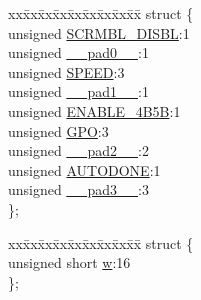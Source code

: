 \begin{DoxyCompactItemize}
\begin{tabbing}
\end{tabbing}\item 
\begin{tabbing}
xx\=xx\=xx\=xx\=xx\=xx\=xx\=xx\=xx\=\kill
struct \{\\
\>unsigned \hyperlink{union_____p_h_y_c_t_r_lbits__t_a55219a321aa70bccb26465498f8caaf0}{SCRMBL\_DISBL}:1\\
\>unsigned \hyperlink{union_____p_h_y_c_t_r_lbits__t_adf71f3d8410c1f1dbbc96680a92c49af}{\_\_pad0\_\_}:1\\
\>unsigned \hyperlink{union_____p_h_y_c_t_r_lbits__t_a95fd4dafd860304d6b44d4fb14881daa}{SPEED}:3\\
\>unsigned \hyperlink{union_____p_h_y_c_t_r_lbits__t_acaf2d0924a107ec6e8d2e31febaf66f9}{\_\_pad1\_\_}:1\\
\>unsigned \hyperlink{union_____p_h_y_c_t_r_lbits__t_aa7e55b5482aacc5ef122817a689f46c5}{ENABLE\_4B5B}:1\\
\>unsigned \hyperlink{union_____p_h_y_c_t_r_lbits__t_a93071ef0e9f696741e0fc90011de4633}{GPO}:3\\
\>unsigned \hyperlink{union_____p_h_y_c_t_r_lbits__t_a4d97cc5f7d51d22fc2bf3eab35c9cb7f}{\_\_pad2\_\_}:2\\
\>unsigned \hyperlink{union_____p_h_y_c_t_r_lbits__t_ad238dd3a8b84eda366fc8a19c6037eb5}{AUTODONE}:1\\
\>unsigned \hyperlink{union_____p_h_y_c_t_r_lbits__t_ad7d7cee33e0c7f447abc4d171c628dd4}{\_\_pad3\_\_}:3\\
\}; \\

\end{tabbing}\item 
\begin{tabbing}
xx\=xx\=xx\=xx\=xx\=xx\=xx\=xx\=xx\=\kill
struct \{\\
\>unsigned short \hyperlink{union_____p_h_y_c_t_r_lbits__t_a160850a4684a3e82c2323033964f2e98}{w}:16\\
\}; \\


\end{tabbing}
\end{DoxyCompactItemize}
